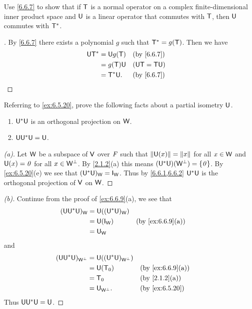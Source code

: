 \begin{ex}\label{ex:6.6.8}
  Use \cref{6.6.7} to show that if \(\mathsf{T}\) is a normal operator on a complex finite-dimensional inner product space and \(\mathsf{U}\) is a linear operator that commutes with \(\mathsf{T}\), then \(\mathsf{U}\) commutes with \(\mathsf{T}^*\).
\end{ex}

\begin{proof}[]
  By \cref{6.6.7} there exists a polynomial \(g\) such that \(\mathsf{T}^* = g(\mathsf{T})\).
  Then we have
  \begin{align*}
    \U \T^* & = \U g(\T) &  & \by{6.6.7}      \\
            & = g(\T) \U &  & (\U \T = \T \U) \\
            & = \T^* \U. &  & \by{6.6.7}
  \end{align*}
\end{proof}

\begin{ex}\label{ex:6.6.9}
  Referring to \cref{ex:6.5.20}, prove the following facts about a partial isometry \(\mathsf{U}\).
  \begin{enumerate}
    \item \(\mathsf{U}^* \mathsf{U}\) is an orthogonal projection on \(\mathsf{W}\).
    \item \(\mathsf{U} \mathsf{U}^* \mathsf{U} = \mathsf{U}\).
  \end{enumerate}
\end{ex}

\begin{proof}[(a)]
  Let \(\mathsf{W}\) be a subspace of \(\mathsf{V}\) over \(\mathit{F}\) such that \(\left\lVert\mathsf{U}(x)\right\rVert = \left\lVert x\right\rVert\) for all \(x \in \mathsf{W}\) and \(\mathsf{U}(x) = \mathit{0}\) for all \(x \in \mathsf{W}^{\perp}\).
  By \cref{2.1.2}(a) this means \((\mathsf{U}^* \mathsf{U})(\mathsf{W}^{\perp}) = \left\lbrace\mathit{0}\right\rbrace\).
  By \cref{ex:6.5.20}(e) we see that \((\U^* \U)_{\W} = \IT[\W]\).
  Thus by \cref{6.6.1,6.6.2} \(\mathsf{U}^* \mathsf{U}\) is the orthogonal projection of \(\mathsf{V}\) on \(\mathsf{W}\).
\end{proof}

\begin{proof}[(b)]
  Continue from the proof of \cref{ex:6.6.9}(a), we see that
  \begin{align*}
    (\U \U^* \U)_{\W} & = \U((\U^* \U)_{\W})                       \\
                      & = \U(\IT[\W])        &  & \by{ex:6.6.9}[a] \\
                      & = \U_{\W}
  \end{align*}
  and
  \begin{align*}
    (\U \U^* \U)_{\W^{\perp}} & = \U((\U^* \U)_{\W^{\perp}})                       \\
                              & = \U(\zT)                    &  & \by{ex:6.6.9}[a] \\
                              & = \zT                        &  & \by{2.1.2}[a]    \\
                              & = \U_{\W^{\perp}}.           &  & \by{ex:6.5.20}
  \end{align*}
  Thus \(\mathsf{U} \mathsf{U}^* \mathsf{U} = \mathsf{U}\).
\end{proof}

